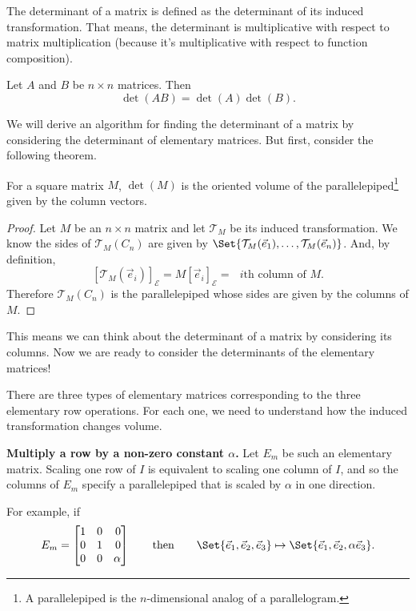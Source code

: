 
The determinant of a matrix is defined as the determinant of its induced transformation.
That means, the determinant is multiplicative with respect to matrix multiplication (because
it's multiplicative with respect to function composition).

\begin{theorem}
	Let $A$ and $B$ be $n\times n$ matrices. Then
	\[
		\det(AB)=\det(A)\det(B).
	\]
\end{theorem}

We will derive an algorithm for finding the determinant of a matrix by considering the determinant of
elementary matrices. But first, consider the following theorem.

\begin{theorem}
	For a square matrix $M$, $\det(M)$ is the oriented volume of the parallelepiped\footnote{ A parallelepiped is the
	$n$-dimensional analog of a parallelogram.} given by the column
	vectors.
\end{theorem}
\begin{proof}
	Let $M$ be an $n\times n$ matrix and let $\mathcal T_M$ be its induced transformation. We know the sides of
	$\mathcal T_{M}(C_n)$ are given by $\Set{\mathcal T_M(\vec e_1),\ldots,\mathcal T_M(\vec e_n)}$. And, by definition,
	\[
		[\mathcal T_M(\vec e_i)]_{\mathcal E} = M[\vec e_i]_{\mathcal E} = \text{ $i$th column of $M$.}
	\]
	Therefore $\mathcal T_{M}(C_n)$ is the parallelepiped whose sides are given by the columns of $M$.
\end{proof}

This means we can think about the determinant of a matrix by considering its columns. Now we are ready to consider
the determinants of the elementary matrices!

\bigskip
There are three types of elementary matrices corresponding to the three elementary row operations. For each
one, we need to understand how the induced transformation changes volume.

{\bfseries Multiply a row by a non-zero constant $\alpha$.} Let $E_m$ be such an elementary matrix. 
Scaling one row of $I$ is equivalent to scaling one column of $I$, and so the columns of $E_m$ specify a parallelepiped
that is scaled by $\alpha$ in one direction.

For example, if
\[
	E_m=\mat{1&0&0\\0&1&0\\0&0&\alpha}\qquad\text{then}\qquad \Set{\vec e_1,\vec e_2,\vec e_3}\mapsto\Set{\vec e_1,\vec e_2,\alpha\vec e_3}.
\]

